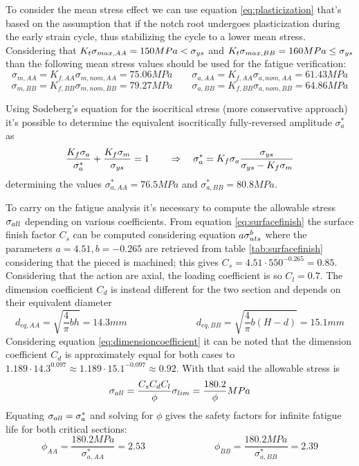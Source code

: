 	To consider the mean stress effect we can use equation \ref{eq:plasticization} that's based on the assumption that if the notch root undergoes plasticization during the early strain cycle, thus stabilizing the cycle to a lower mean stress. Considering that $ K_t \sigma_{max,AA} = 150 MPa < \sigma_{ys}$ and $K_t \sigma_{max,BB} = 160 MPa \leq \sigma_{ys}$ than the following mean stress values should be used for the fatigue verification:
	\[ \sigma_{m,AA} = K_{f,AA} \sigma_{m,nom,AA} =75.06 MPa \qquad \sigma_{a,AA} = K_{f,AA} \sigma_{a,nom,AA} = 61.43 MPa \]
	\[ \sigma_{m,BB} = K_{f,BB} \sigma_{m,nom,BB} =79.27 MPa \qquad \sigma_{a,BB} = K_{f,BB} \sigma_{a,nom,BB} = 64.86 MPa \]
	
	Using Sodeberg's equation for the isocritical stress (more conservative approach) it's possible to determine the equivalent isocritically fully-reversed amplitude $\sigma_a^*$ as
	\[ \frac{K_f \sigma_a}{\sigma_a^*} + \frac{K_f \sigma_m}{\sigma_{ys}} = 1 \qquad \Rightarrow \quad \sigma_a^* = K_f \sigma_a \frac{\sigma_{ys}}{\sigma_{ys} - K_f \sigma_m} \]
	determining the values $\sigma_{a,AA}^* = 76.5MPa$ and $\sigma_{a,BB}^* = 80.8MPa$.
	
	To carry on the fatigue analysis it's necessary to compute the allowable stress $\sigma_{all}$ depending on various coefficients. From equation \ref{eq:surfacefinish} the surface finish factor $C_s$ can be computed considering equation $a \sigma_{uts} ^b$ where the parameters $a = 4.51, b = -0.265$ are retrieved from table \ref{tab:surfacefinish} considering that the pieced is machined; this gives $C_s = 4.51 \cdot 550^{-0.265} = 0.85$. Considering that the action are axial, the loading coefficient is so $C_l = 0.7$. The dimension coefficient $C_d$ is instead different for the two section and depends on their equivalent diameter 
	\[ d_{eq,AA} = \sqrt{\frac 4 \pi bh } = 14.3 mm \hspace{3cm} d_{eq,BB} = \sqrt{\frac 4 \pi b (H-d)} = 15.1mm \]
	Considering equation \ref{eq:dimensioncoefficient} it can be noted that the dimension coefficient $C_d$ is approximately equal for both cases to $1.189\cdot 14.3^{0.097} \approx 1.189\cdot 15.1^{-0.097} \approx 0.92$. With that said the allowable stress is
	\[ \sigma_{all} = \frac{C_s C_d C_l }{\phi} \sigma_{lim} = \frac{180.2}{\phi} MPa \]
	Equating $\sigma_{all} = \sigma_a^*$ and solving for $\phi$ gives the safety factors for infinite fatigue life for both critical sections:
	\[ \phi_{AA} = \frac{180.2MPa}{\sigma_{a,AA}^*} = 2.53 \hspace{3cm} \phi_{BB} = \frac{180.2MPa}{\sigma_{a,BB}^*} = 2.39 \]
	
